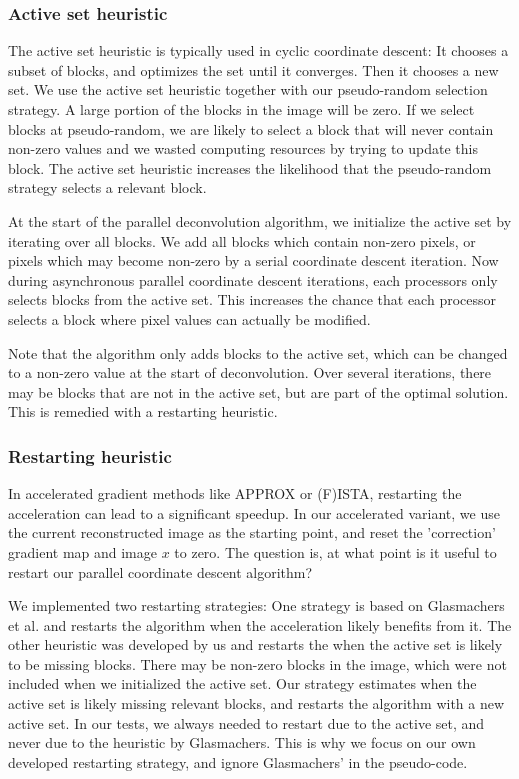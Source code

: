 \subsubsection*{Active set heuristic}
The active set heuristic is typically used in cyclic coordinate descent: It chooses a subset of blocks, and optimizes the set until it converges. Then it chooses a  new set. We use the active set heuristic together with our pseudo-random selection strategy. A large portion of the blocks in the image will be zero. If we select blocks at pseudo-random, we are likely to select a block that will never contain non-zero values and we wasted computing resources by trying to update this block. The active set heuristic increases the likelihood that the pseudo-random strategy selects a relevant block. 

At the start of the parallel deconvolution algorithm, we initialize the active set by iterating over all blocks. We add all blocks which contain non-zero pixels, or pixels which may become non-zero by a serial coordinate descent iteration. Now during asynchronous parallel coordinate descent iterations, each processors only selects blocks from the active set. This increases the chance that each processor selects a block where pixel values can actually be modified.

Note that the algorithm only adds blocks to the active set, which can be changed to a non-zero value at the start of deconvolution. Over several iterations, there may be blocks that are not in the active set, but are part of the optimal solution. This is remedied with a restarting heuristic.


\subsubsection*{Restarting heuristic}
In accelerated gradient methods like APPROX or (F)ISTA, restarting the acceleration can lead to a significant speedup\cite{fercoq2016restarting}. In our accelerated variant, we use the current reconstructed image as the starting point, and reset the 'correction' gradient map and image $x$ to zero. The question is, at what point is it useful to restart our parallel coordinate descent algorithm?

We implemented two restarting strategies: One strategy is based on Glasmachers et al.\cite{glasmachers2014coordinate} and restarts the algorithm when the acceleration likely benefits from it. The other heuristic was developed by us and restarts the when the active set is likely to be missing blocks. There may be non-zero blocks in the image, which were not included when we initialized the active set. Our strategy estimates when the active set is likely missing relevant blocks, and restarts the algorithm with a new active set. In our tests, we always needed to restart due to the active set, and never due to the heuristic by Glasmachers. This is why we focus on our own developed restarting strategy, and ignore Glasmachers' in the pseudo-code.

